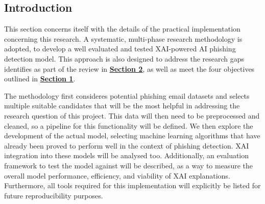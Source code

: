 
\subsection*{Introduction}
This section concerns itself with the details of the practical implementation concerning this research. A systematic, multi-phase research methodology is adopted, to develop a well evaluated and tested XAI-powered AI phishing detection model. This approach is also designed to address the research gaps identifies as part of the review in \hyperref[sec:2-literature-review]{\uline{\textbf{Section 2}}}, as well as meet the four objectives outlined in \hyperref[sec:1-introduction]{\uline{\textbf{Section 1}}}.\newline

\noindent The methodology first consideres potential phishing email datasets and selects multiple suitable candidates that will be the most helpful in addressing the research question of this project. This data will then need to be preprocessed and cleaned, so a pipeline for this functionality will be defined. We then explore the development of the actual model, selecting machine learning algorithms that have already been proved to perform well in the context of phishing detection. XAI integration into these models will be analysed too. Additionally, an evaluation framework to test the model against will be described, as a way to measure the overall model performance, efficiency, and viability of XAI explanations. Furthermore, all tools required for this implementation will explicitly be listed for future reproducibility purposes.

